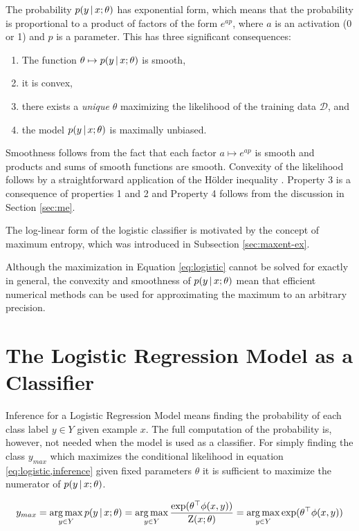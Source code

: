 The probability $p(y\mbox{$ \, | \, $} x\mbox{$ ; \, $} \theta)$ has exponential form,
which means that the probability is proportional to a product of
factors of the form $e^{ap}$, where $a$ is an activation (0 or 1) and
$p$ is a parameter. This has three significant consequences:

\begin{enumerate}
\item The function $\theta \mapsto p(y\mbox{$ \, | \, $} x\mbox{$ ; \, $} \theta)$ is smooth,
\item it is convex,
\item there exists a {\it unique} $\theta$ maximizing the likelihood of the training data $\mathcal{D}$, and
\item the model $p(y\mbox{$ \, | \, $} x\mbox{$ ; \, $} \theta)$ is maximally unbiased. 
\end{enumerate}

Smoothness follows from the fact that each factor $a \mapsto e^{ap}$
is smooth and products and sums of smooth functions are
smooth. Convexity of the likelihood follows by a straightforward application of the Hölder inequality \cite{}. Property 3 is a consequence of properties 1 and 2 and
Property 4 follows from the discussion in Section \ref{sec:me}.

The log-linear form of the logistic classifier is motivated by the
concept of maximum entropy, which was introduced in Subsection
\ref{sec:maxent-ex}. 

Although the maximization in Equation \ref{eq:logistic} cannot be
solved for exactly in general, the convexity and smoothness of
$p(y\mbox{$ \, | \, $} x\mbox{$ ; \, $} \theta)$ mean that efficient numerical methods can
be used for approximating the maximum to an arbitrary precision.

\section{The Logistic Regression Model as a Classifier}

Inference for a Logistic Regression Model means finding the
probability of each class label $y \in Y$ given example $x$. The full
computation of the probability is, however, not needed when the model
is used as a classifier. For simply finding the class $y_{max}$ which
maximizes the conditional likelihood in equation
\ref{eq:logistic,inference} given fixed parameters $\theta$ it is
sufficient to maximize the numerator of $p(y \mbox{$ \, | \, $} x\mbox{$ ; \, $}\theta)$.

\begin{equation}y_{max} = \operatorname*{arg\,max}_{y \in Y} p(y\mbox{$ \, | \, $} x\mbox{$ ; \, $} \theta) = \operatorname*{arg\,max}_{y\in Y} \frac{\exp(\theta^\top \phi(x,y))}{\mbox{${\rm Z}$}(x;\theta)} = \operatorname*{arg\,max}_{y \in Y} \exp(\theta^\top \phi(x,y))\label{eq:logistic,inference}\end{equation}

